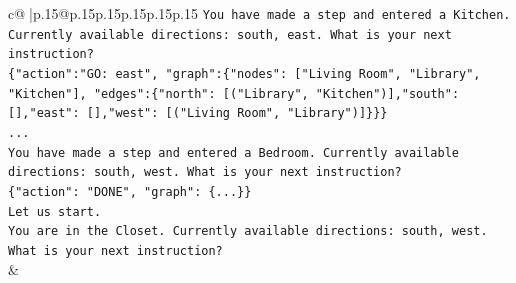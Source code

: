 \documentclass{article}
\begin{document}
{\begin{supertabular}{c@{$\;$}|p{.15\linewidth}@{}p{.15\linewidth}p{.15\linewidth}p{.15\linewidth}p{.15\linewidth}p{.15\linewidth}}
{{{\texttt{You have made a step and entered a Kitchen. Currently available directions: south, east. What is your next instruction?} \\
\texttt{\{"action":"GO: east", "graph":\{"nodes": {[}"Living Room", "Library", "Kitchen"{]}, "edges":\{"north": {[}("Library", "Kitchen"){]},"south": {[}{]},"east": {[}{]},"west": {[}("Living Room", "Library"){]}\}\}\}} \\
\texttt{...} \\
\texttt{You have made a step and entered a Bedroom. Currently available directions: south, west. What is your next instruction?} \\
\texttt{\{"action": "DONE", "graph": \{...\}\}} \\
\texttt{Let us start.} \\
\texttt{You are in the Closet. Currently available directions: south, west. What is your next instruction?} \\
            }
        }
    }
    & \\ \\


\end{supertabular}}
\end{document}
